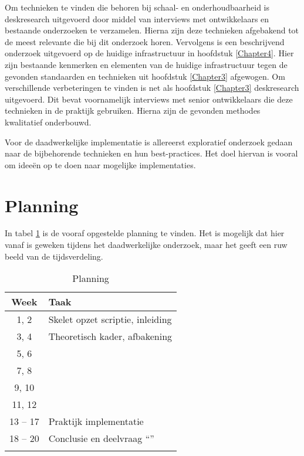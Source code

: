 Om technieken te vinden die behoren bij schaal- en onderhoudbaarheid is deskresearch uitgevoerd door middel van interviews met ontwikkelaars en bestaande onderzoeken te verzamelen. Hierna zijn deze technieken afgebakend tot de meest relevante die bij dit onderzoek horen. Vervolgens is een beschrijvend onderzoek uitgevoerd op de huidige infrastructuur in hoofdstuk \ref{Chapter4}. Hier zijn bestaande kenmerken en elementen van de huidige infrastructuur tegen de gevonden standaarden en technieken uit hoofdstuk \ref{Chapter3} afgewogen. Om verschillende verbeteringen te vinden is net als hoofdstuk \ref{Chapter3} deskresearch uitgevoerd. Dit bevat voornamelijk interviews met senior ontwikkelaars die deze technieken in de praktijk gebruiken. Hierna zijn de gevonden methodes kwalitatief onderbouwd.

Voor de daadwerkelijke implementatie is allereerst exploratief onderzoek gedaan naar de bijbehorende technieken en hun best-practices. Het doel hiervan is vooral om ideeën op te doen naar mogelijke implementaties.

\section{Planning}
In tabel \ref{tab:planning} is de vooraf opgestelde planning te vinden. Het is mogelijk dat hier vanaf is geweken tijdens het daadwerkelijke onderzoek, maar het geeft een ruw beeld van de tijdsverdeling.

\begin{table}[H]
	\caption{Planning}
	\label{tab:planning}
	\centering
	\begin{tabular}{c p{12cm}}
		\toprule
		\textbf{Week} & \textbf{Taak}\\
		\midrule
			1, 2 & Skelet opzet scriptie, inleiding \\
			3, 4 & Theoretisch kader, afbakening \\
			5, 6 & \deeltechnieken \\
			7, 8 & \deelhuidig \\
			9, 10 & \deelverbetering \\
			11, 12 & \deelimplementatie \\
			13 -- 17 & Praktijk implementatie \\
			18 -- 20 & Conclusie en deelvraag \enquote{\deelrequirements} \\
		\bottomrule\\
	\end{tabular}
\end{table}

